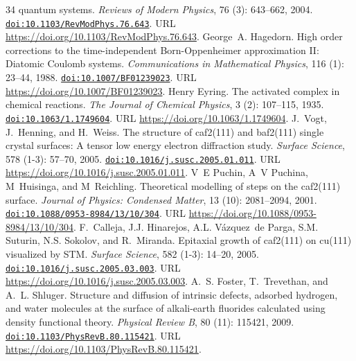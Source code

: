 \documentclass[11pt,a4paper]{article}
\theoremstyle{plain}
\theoremstyle{definition}
\theoremstyle{remark}
\providecommand{\doi}[1]{\href{https://doi.org/#1}{\texttt{doi:#1}}}
\begin{document}
\begin{thebibliography}{34}
  quantum systems.
\newblock \emph{Reviews of Modern Physics}, 76 (3): 643--662,
  2004.
\newblock \doi{10.1103/RevModPhys.76.643}.
\newblock URL \url{https://doi.org/10.1103/RevModPhys.76.643}.
George~A. Hagedorn.
\newblock High order corrections to the time-independent {Born-Oppenheimer}
  approximation {II}: Diatomic {Coulomb} systems.
\newblock \emph{Communications in Mathematical Physics}, 116
  (1): 23--44, 1988.
\newblock \doi{10.1007/BF01239023}.
\newblock URL \url{https://doi.org/10.1007/BF01239023}.
Henry Eyring.
\newblock The activated complex in chemical reactions.
\newblock \emph{The Journal of Chemical Physics}, 3 (2):
  107--115, 1935.
\newblock \doi{10.1063/1.1749604}.
\newblock URL \url{https://doi.org/10.1063/1.1749604}.
J.~Vogt, J.~Henning, and H.~Weiss.
\newblock The structure of caf2(111) and baf2(111) single crystal surfaces: A
  tensor low energy electron diffraction study.
\newblock \emph{Surface Science}, 578 (1-3): 57--70, 2005.
\newblock \doi{10.1016/j.susc.2005.01.011}.
\newblock URL \url{https://doi.org/10.1016/j.susc.2005.01.011}.
V~E Puchin, A~V Puchina, M~Huisinga, and M~Reichling.
\newblock Theoretical modelling of steps on the caf2(111) surface.
\newblock \emph{Journal of Physics: Condensed Matter}, 13
  (10): 2081--2094, 2001.
\newblock \doi{10.1088/0953-8984/13/10/304}.
\newblock URL \url{https://doi.org/10.1088/0953-8984/13/10/304}.
F.~Calleja, J.J. Hinarejos, A.L. Vázquez~de Parga, S.M. Suturin, N.S. Sokolov,
  and R.~Miranda.
\newblock Epitaxial growth of caf2(111) on cu(111) visualized by {STM}.
\newblock \emph{Surface Science}, 582 (1-3): 14--20, 2005.
\newblock \doi{10.1016/j.susc.2005.03.003}.
\newblock URL \url{https://doi.org/10.1016/j.susc.2005.03.003}.
A.~S. Foster, T.~Trevethan, and A.~L. Shluger.
\newblock Structure and diffusion of intrinsic defects, adsorbed hydrogen, and
  water molecules at the surface of alkali-earth fluorides calculated using
  density functional theory.
\newblock \emph{Physical Review B}, 80 (11): 115421, 2009.
\newblock \doi{10.1103/PhysRevB.80.115421}.
\newblock URL \url{https://doi.org/10.1103/PhysRevB.80.115421}.

\end{thebibliography}
\end{document}
